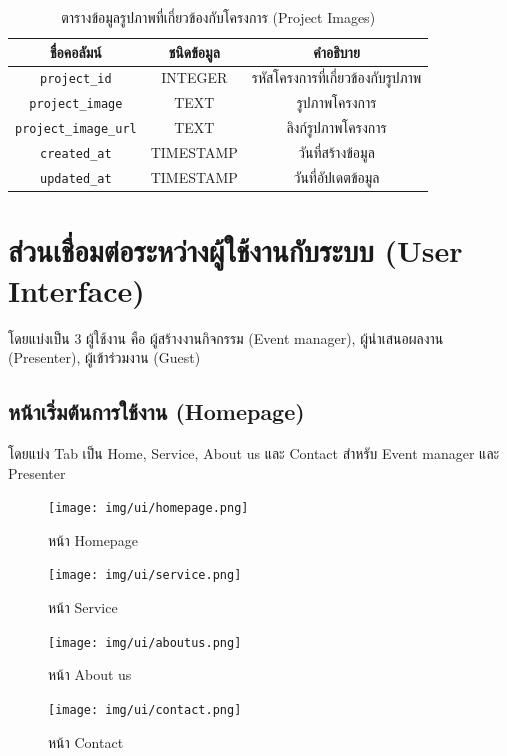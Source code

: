 \begin{table}[hb]
    \centering
    \begin{tabular}{|c|c|c|}
        \hline
        ชื่อคอลัมน์                   & ชนิดข้อมูล   & คำอธิบาย                    \\ \hline
        \verb |project_id|        & INTEGER   & รหัสโครงการที่เกี่ยวข้องกับรูปภาพ \\ \hline
        \verb |project_image|     & TEXT      & รูปภาพโครงการ              \\ \hline
        \verb |project_image_url| & TEXT      & ลิงก์รูปภาพโครงการ           \\ \hline
        \verb |created_at|        & TIMESTAMP & วันที่สร้างข้อมูล               \\ \hline
        \verb |updated_at|        & TIMESTAMP & วันที่อัปเดตข้อมูล              \\ \hline
    \end{tabular}
    \caption{ตารางข้อมูลรูปภาพที่เกี่ยวข้องกับโครงการ (Project Images)}
    \label{tab:project_images_data}
\end{table}

\clearpage %
\section{ส่วนเชื่อมต่อระหว่างผู้ใช้งานกับระบบ (User Interface)}


โดยแบ่งเป็น 3 ผู้ใช้งาน คือ ผู้สร้างงานกิจกรรม (Event manager), ผู้นำเสนอผลงาน (Presenter), ผู้เข้าร่วมงาน (Guest)
\subsection{หน้าเริ่มต้นการใช้งาน (Homepage)}
โดยแบ่ง Tab เป็น Home, Service, About us และ Contact สำหรับ Event manager และ Presenter

\begin{figure}[h!] %
    \begin{center}
        \texttt{[image: img/ui/homepage.png]}
    \end{center}
    \caption{หน้า Homepage}
    \label{fig:homepage}

    \begin{center}
        \texttt{[image: img/ui/service.png]}
    \end{center}
    \caption{หน้า Service}
    \label{fig:service}
\end{figure}


\begin{figure}
    \begin{center}
        \texttt{[image: img/ui/aboutus.png]}
    \end{center}
    \caption{หน้า About us}
    \label{fig:aboutus}

    \begin{center}
        \texttt{[image: img/ui/contact.png]}
    \end{center}
    \caption{หน้า Contact}
    \label{fig:contact}
\end{figure}

